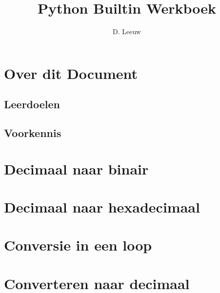 \documentclass[a4paper,12pt,twoside,openright,titlepage]{article}
\author{D. Leeuw}
\title{Python Builtin Werkboek}
\date{\today\\
1.0.0 \\
\vfill
\raggedright
\copyright\ 2025 Dennis Leeuw\\
}
\begin{document}

\maketitle


\section{Over dit Document}
\subsection{Leerdoelen}

\subsection{Voorkennis}




\section{Decimaal naar binair}


\section{Decimaal naar hexadecimaal}


\section{Conversie in een loop}


\section{Converteren naar decimaal}


%

%
\end{document}
